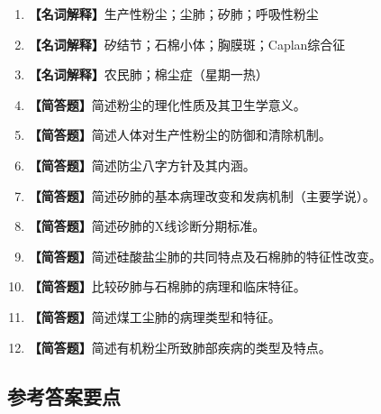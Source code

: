 \begin{enumerate}[leftmargin=*, itemsep=8pt]
    \item \textbf{【名词解释】}生产性粉尘；尘肺；矽肺；呼吸性粉尘
    \item \textbf{【名词解释】}矽结节；石棉小体；胸膜斑；Caplan综合征
    \item \textbf{【名词解释】}农民肺；棉尘症（星期一热）
    \item \textbf{【简答题】}简述粉尘的理化性质及其卫生学意义。
    \item \textbf{【简答题】}简述人体对生产性粉尘的防御和清除机制。
    \item \textbf{【简答题】}简述防尘八字方针及其内涵。
    \item \textbf{【简答题】}简述矽肺的基本病理改变和发病机制（主要学说）。
    \item \textbf{【简答题】}简述矽肺的X线诊断分期标准。
    \item \textbf{【简答题】}简述硅酸盐尘肺的共同特点及石棉肺的特征性改变。
    \item \textbf{【简答题】}比较矽肺与石棉肺的病理和临床特征。
    \item \textbf{【简答题】}简述煤工尘肺的病理类型和特征。
    \item \textbf{【简答题】}简述有机粉尘所致肺部疾病的类型及特点。
\end{enumerate}

\subsection*{参考答案要点}

